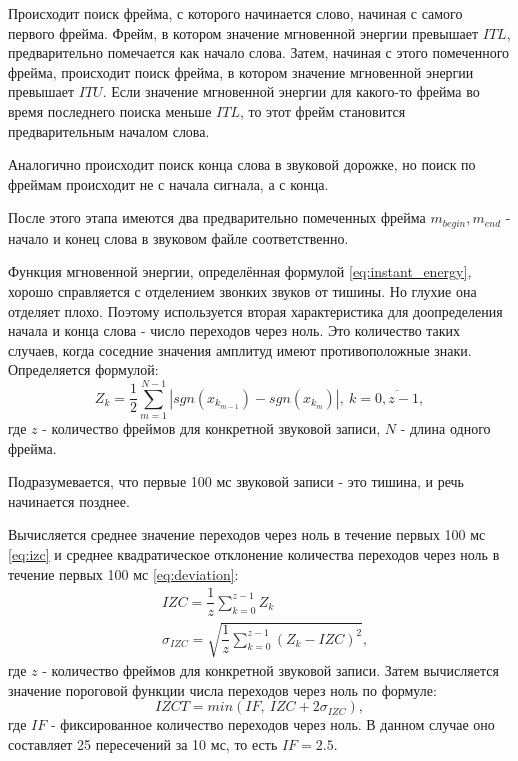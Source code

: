 Происходит поиск фрейма, с которого начинается слово, начиная с самого первого фрейма. Фрейм, в котором значение мгновенной энергии превышает $ITL$, предварительно помечается как начало слова. Затем, начиная с этого помеченного фрейма, происходит поиск фрейма, в котором значение мгновенной энергии превышает $ITU$. Если значение мгновенной энергии для какого-то фрейма во время последнего поиска меньше $ITL$, то этот фрейм становится предварительным началом слова. 

Аналогично происходит поиск конца слова в звуковой дорожке, но поиск по фреймам происходит не с начала сигнала, а с конца.

После этого этапа имеются два предварительно помеченных фрейма $m_{begin}, m_{end}$  - начало и конец слова в звуковом файле соответственно.

Функция мгновенной энергии, определённая формулой \eqref{eq:instant_energy}, хорошо справляется с отделением звонких звуков от тишины. Но глухие она отделяет плохо. Поэтому используется вторая характеристика для доопределения начала и конца слова - число переходов через ноль. Это количество таких случаев, когда соседние значения амплитуд имеют противоположные знаки. Определяется формулой:
\begin{equation}
	Z_k = \dfrac{1}{2} \sum_{m=1}^{N-1} |sgn(x_{k_{m-1}}) - sgn(x_{k_m})|,~k=\overline{0,z-1},
\end{equation}
где $z$ - количество фреймов для конкретной звуковой записи, $N$ - длина одного фрейма.

Подразумевается, что первые 100 мс звуковой записи - это тишина, и речь начинается позднее.

Вычисляется среднее значение переходов через ноль в течение первых 100 мс \eqref{eq:izc} и среднее квадратическое отклонение количества переходов через ноль в течение первых 100 мс \eqref{eq:deviation}:
\begin{align}
	\label{eq:izc}
	&IZC = \dfrac{1}{z} \sum_{k=0}^{z-1} Z_k \\
	\label{eq:deviation}
	&\sigma_{IZC} = \sqrt{\dfrac{1}{z} \sum_{k=0}^{z-1} (Z_k - IZC)^2},
\end{align}
где $z$ - количество фреймов для конкретной звуковой записи.
Затем вычисляется значение пороговой функции числа переходов через ноль по формуле:
\begin{equation}
	IZCT = min(IF,~IZC + 2 \sigma_{IZC}),
\end{equation}
где $IF$ - фиксированное количество переходов через ноль. В данном случае оно составляет 25 пересечений за 10 мс, то есть $IF=2.5$. 

